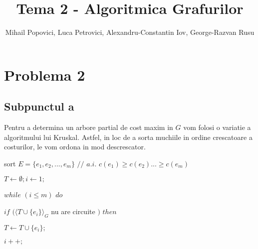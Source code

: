 \documentclass{article}
\title{Tema 2 - Algoritmica Grafurilor}
\author{Mihail Popovici, Luca Petrovici, Alexandru-Constantin Iov, George-Razvan Rusu}
\begin{document}
\maketitle

\section*{\fontsize{20}{50}\selectfont Problema 2}
\subsection*{\fontsize{16}{30}\selectfont Subpunctul a}
{\fontsize{14}{16}\selectfont 
    Pentru a determina un arbore partial de cost maxim in $G$ vom folosi o variatie a algoritmului lui Kruskal. Astfel, in loc de a sorta muchiile in ordine crescatoare a costurilor, le vom ordona in mod descrescator.
    \\ 
    \par sort $E=\lbrace e_1, e_2, ..., e_m \rbrace$ $//$ $a.i.$  $c(e_1)\geq c(e_2)...\geq c(e_m)$

    \par $T \leftarrow \emptyset; i \leftarrow 1;$
    \par $while$  $(i \leq m)$  $do$
    \par \hspace*{1cm} $if$ $(\langle T \cup \lbrace e_i \rbrace \rangle _G$ nu are circuite $)$  $then$
    \par \hspace*{1.5cm} $ T \leftarrow T \cup \lbrace e_i \rbrace ;$
    \par \hspace*{1cm} $i++;$
    }
\end{document}
